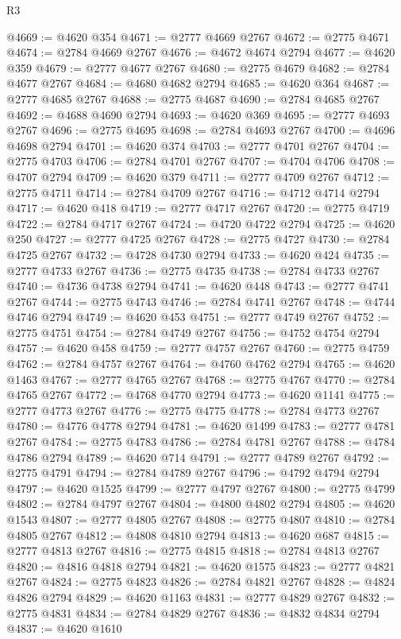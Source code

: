 \begin{lexlean}{R3}
\begin{coremodule}
@4669 := @4620 @354
@4671 := @2777 @4669 @2767
@4672 := @2775 @4671
@4674 := @2784 @4669 @2767
@4676 := @4672 @4674 @2794
@4677 := @4620 @359
@4679 := @2777 @4677 @2767
@4680 := @2775 @4679
@4682 := @2784 @4677 @2767
@4684 := @4680 @4682 @2794
@4685 := @4620 @364
@4687 := @2777 @4685 @2767
@4688 := @2775 @4687
@4690 := @2784 @4685 @2767
@4692 := @4688 @4690 @2794
@4693 := @4620 @369
@4695 := @2777 @4693 @2767
@4696 := @2775 @4695
@4698 := @2784 @4693 @2767
@4700 := @4696 @4698 @2794
@4701 := @4620 @374
@4703 := @2777 @4701 @2767
@4704 := @2775 @4703
@4706 := @2784 @4701 @2767
@4707 := @4704 @4706
@4708 := @4707 @2794
@4709 := @4620 @379
@4711 := @2777 @4709 @2767
@4712 := @2775 @4711
@4714 := @2784 @4709 @2767
@4716 := @4712 @4714 @2794
@4717 := @4620 @418
@4719 := @2777 @4717 @2767
@4720 := @2775 @4719
@4722 := @2784 @4717 @2767
@4724 := @4720 @4722 @2794
@4725 := @4620 @250
@4727 := @2777 @4725 @2767
@4728 := @2775 @4727
@4730 := @2784 @4725 @2767
@4732 := @4728 @4730 @2794
@4733 := @4620 @424
@4735 := @2777 @4733 @2767
@4736 := @2775 @4735
@4738 := @2784 @4733 @2767
@4740 := @4736 @4738 @2794
@4741 := @4620 @448
@4743 := @2777 @4741 @2767
@4744 := @2775 @4743
@4746 := @2784 @4741 @2767
@4748 := @4744 @4746 @2794
@4749 := @4620 @453
@4751 := @2777 @4749 @2767
@4752 := @2775 @4751
@4754 := @2784 @4749 @2767
@4756 := @4752 @4754 @2794
@4757 := @4620 @458
@4759 := @2777 @4757 @2767
@4760 := @2775 @4759
@4762 := @2784 @4757 @2767
@4764 := @4760 @4762 @2794
@4765 := @4620 @1463
@4767 := @2777 @4765 @2767
@4768 := @2775 @4767
@4770 := @2784 @4765 @2767
@4772 := @4768 @4770 @2794
@4773 := @4620 @1141
@4775 := @2777 @4773 @2767
@4776 := @2775 @4775
@4778 := @2784 @4773 @2767
@4780 := @4776 @4778 @2794
@4781 := @4620 @1499
@4783 := @2777 @4781 @2767
@4784 := @2775 @4783
@4786 := @2784 @4781 @2767
@4788 := @4784 @4786 @2794
@4789 := @4620 @714
@4791 := @2777 @4789 @2767
@4792 := @2775 @4791
@4794 := @2784 @4789 @2767
@4796 := @4792 @4794 @2794
@4797 := @4620 @1525
@4799 := @2777 @4797 @2767
@4800 := @2775 @4799
@4802 := @2784 @4797 @2767
@4804 := @4800 @4802 @2794
@4805 := @4620 @1543
@4807 := @2777 @4805 @2767
@4808 := @2775 @4807
@4810 := @2784 @4805 @2767
@4812 := @4808 @4810 @2794
@4813 := @4620 @687
@4815 := @2777 @4813 @2767
@4816 := @2775 @4815
@4818 := @2784 @4813 @2767
@4820 := @4816 @4818 @2794
@4821 := @4620 @1575
@4823 := @2777 @4821 @2767
@4824 := @2775 @4823
@4826 := @2784 @4821 @2767
@4828 := @4824 @4826 @2794
@4829 := @4620 @1163
@4831 := @2777 @4829 @2767
@4832 := @2775 @4831
@4834 := @2784 @4829 @2767
@4836 := @4832 @4834 @2794
@4837 := @4620 @1610

\end{coremodule}
\end{lexlean}
